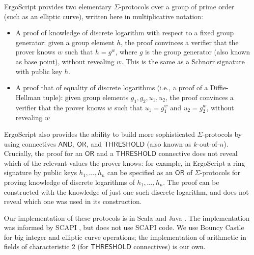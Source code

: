 \documentclass[11pt]{article}
\newcommand{\authnote}[2]{\marginpar{\parbox{\marginparwidth}{\tiny %
  \textsf{#1 {\textcolor{blue}{notes: #2}}}}}%
  \textcolor{blue}{\textbf{\dag}}}
\newcommand{\authnote}[2]{
  \textsf{#1 \textcolor{blue}{: #2}}}
\newcommand{\authnote}[2]{}
\newcommand{\lnote}[1]{{\authnote{\textcolor{orange}{Leo notes}}{#1}}}
\newcommand{\langname}{ErgoScript\xspace}
\newcommand{\andnode}{\ensuremath{\mathsf{AND}}}
\newcommand{\ornode}{\ensuremath{\mathsf{OR}}}
\newcommand{\tnode}{\ensuremath{\mathsf{THRESHOLD}}}
\begin{document}
\langname provides two elementary $\Sigma$-protocols over a group of prime order (such as an elliptic curve), written here in multiplicative notation:
\begin{itemize}
\item A proof of knowledge of discrete logarithm with respect to a fixed group generator: given a group element $h$, the proof convinces a verifier that the prover knows $w$ such that $h=g^w$, where $g$ is the group generator (also known as base point), without revealing $w$. This is the same as a Schnorr signature with public key $h$.
\item A proof that of equality of discrete logarithms (i.e., a proof of a Diffie-Hellman tuple): given group elements $g_1, g_2, u_1, u_2$, the proof convinces a verifier that the prover knows $w$ such that $u_1=g_1^w$ and $u_2=g_2^w$, without revealing $w$
\end{itemize}
\lnote{This is not the notation used in the code, but in the code, $g$ is overloaded verloaded because it's the base point in item 1 and an arbitrary point in item 2; $h$ is also overloaded. Perhaps we should change the code to better notation and then make this text match it.}


\langname also provides the ability to build more sophisticated $\Sigma$-protocols by using connectives $\andnode$, $\ornode$, and $\tnode$ (also known as $k$-out-of-$n$).
Crucially, the proof for an $\ornode$ and a $\tnode$ connective does not reveal which of the relevant values the prover knows: for example, in \langname a ring signature by public keys $h_1, \dots, h_n$ can be specified as an $\ornode$ of $\Sigma$-protocols for proving knowledge of discrete logarithms of $h_1, \dots, h_n$. The proof can be constructed with the knowledge of just one such discrete logarithm, and does not reveal which one was used in its construction. 

Our implementation of these protocols is in Scala \cite{scala} and Java \cite{java}. The implementation was informed by SCAPI \cite{scapi}, but does not use SCAPI code. \lnote{our code currently has subdirectories named ``scapi'' so it's hard to say we don't use it\dots} We use Bouncy Castle \cite{bouncycastle} for big integer and elliptic curve operations; the implementation of arithmetic in fields of characteristic 2 (for $\tnode$ connectives) is our own. \lnote{any other credits or background info?}
\end{document}
